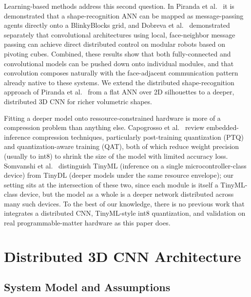 \documentclass[12pt]{article}
\begin{document}
Learning-based methods address this second question. In Piranda et al.~\cite{piranda2024ai4pm} it is demonstrated that a shape-recognition ANN can be mapped as message-passing agents directly onto a BlinkyBlocks grid, and Dobreva et al.~\cite{dobreva} demonstrated separately that convolutional architectures using local, face-neighbor message passing can achieve direct distributed control on modular robots based on pivoting cubes. Combined, these results show that both fully-connected and convolutional models can be pushed down onto individual modules, and that convolution composes naturally with the face-adjacent communication pattern already native to these systems. We extend the distributed shape-recognition approach of Piranda et al.~\cite{piranda2024ai4pm} from a flat ANN over 2D silhouettes to a deeper, distributed 3D CNN for richer volumetric shapes.

Fitting a deeper model onto ressource-constrained hardware is more of a compression problem than anything else. Capogrosso et al.~\cite{capogrosso} review embedded-inference compression techniques, particularly post-training quantization (PTQ) and quantization-aware training (QAT), both of which reduce weight precision (usually to int8) to shrink the size of the model with limited accuracy loss. Somvanshi et al.~\cite{somvanshi} distinguish TinyML (inference on a single micro\-con\-trol\-ler-class device) from TinyDL (deeper models under the same resource envelope); our setting sits at the intersection of these two, since each module is itself a TinyML-class device, but the model as a whole is a deeper network distributed across many such devices. To the best of our knowledge, there is no previous work that integrates a distributed CNN, TinyML-style int8 quantization, and validation on real programmable-matter hardware as this paper does.

\section{Distributed 3D CNN Architecture}
\label{sec:architecture}

\subsection{System Model and Assumptions}
\label{sec:assumptions}
\end{document}
